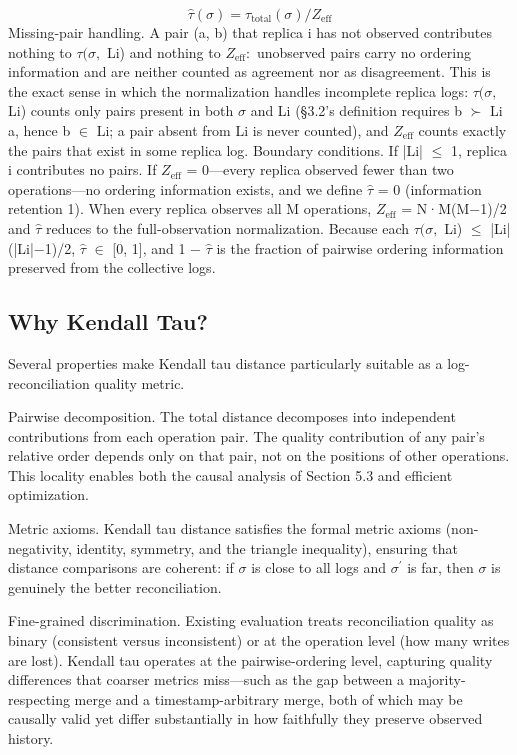 \documentclass[11pt]{article}
\begin{document}
\[ \hat{\tau}(\sigma ) = \tau _{\mathrm{total}}(\sigma ) / Z_{\mathrm{eff}} \]
Missing-pair handling. A pair (a, b) that replica i has not observed contributes nothing to $\tau (\sigma ,$ Li) and nothing to $Z_{\mathrm{eff}}:$ unobserved pairs carry no ordering information and are neither counted as agreement nor as disagreement. This is the exact sense in which the normalization handles incomplete replica logs: $\tau (\sigma ,$ Li) counts only pairs present in both $\sigma $ and Li (§3.2's definition requires b $\succ $ Li a, hence b $\in $ Li; a pair absent from Li is never counted), and $Z_{\mathrm{eff}}$ counts exactly the pairs that exist in some replica log. Boundary conditions. If |Li| $\leq $ 1, replica i contributes no pairs. If $Z_{\mathrm{eff}}$ = 0—every replica observed fewer than two operations—no ordering information exists, and we define $\hat{\tau}$ = 0 (information retention 1). When every replica observes all M operations, $Z_{\mathrm{eff}}$ = N·M(M−1)/2 and $\hat{\tau}$ reduces to the full-observation normalization. Because each $\tau (\sigma ,$ Li) $\leq $ |Li|(|Li|−1)/2, $\hat{\tau}$ $\in $ [0, 1], and 1 $-$ $\hat{\tau}$ is the fraction of pairwise ordering information preserved from the collective logs.

\subsection{Why Kendall Tau?}
Several properties make Kendall tau distance particularly suitable as a log-reconciliation quality metric.

Pairwise decomposition. The total distance decomposes into independent contributions from each operation pair. The quality contribution of any pair's relative order depends only on that pair, not on the positions of other operations. This locality enables both the causal analysis of Section 5.3 and efficient optimization.

Metric axioms. Kendall tau distance satisfies the formal metric axioms (non-negativity, identity, symmetry, and the triangle inequality), ensuring that distance comparisons are coherent: if $\sigma $ is close to all logs and $\sigma^{\prime}$ is far, then $\sigma $ is genuinely the better reconciliation.

Fine-grained discrimination. Existing evaluation treats reconciliation quality as binary (consistent versus inconsistent) or at the operation level (how many writes are lost). Kendall tau operates at the pairwise-ordering level, capturing quality differences that coarser metrics miss—such as the gap between a majority-respecting merge and a timestamp-arbitrary merge, both of which may be causally valid yet differ substantially in how faithfully they preserve observed history.
\end{document}
